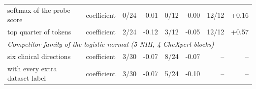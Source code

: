 \begin{table}[h]
\begin{tabular}{llrrrrrr}
\quad softmax of the probe score & coefficient & 0/24 & -0.01 & 0/12 & -0.00 & 12/12 & +0.16 \\
\quad top quarter of tokens & coefficient & 2/24 & -0.12 & 3/12 & -0.05 & 12/12 & +0.57 \\
\midrule
\multicolumn{8}{l}{\textit{Competitor family of the logistic normal (5 NIH, 4 CheXpert blocks)}} \\
\quad six clinical directions & coefficient & 3/30 & -0.07 & 8/24 & -0.07 & -- & -- \\
\quad with every extra dataset label & coefficient & 3/30 & -0.07 & 5/24 & -0.10 & -- & -- \\
\bottomrule
\end{tabular}
\end{table}
